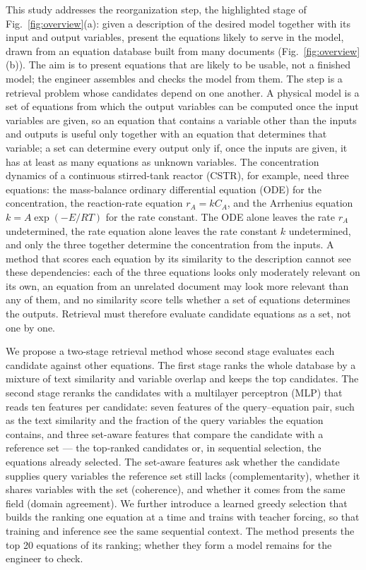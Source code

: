 This study addresses the reorganization step, the highlighted stage of
Fig.~\ref{fig:overview}(a): given a description of the desired model together with its input and
output variables, present the equations likely to serve in the model, drawn from an equation
database built from many documents (Fig.~\ref{fig:overview}(b)). The aim is to present equations
that are likely to be usable, not a finished model; the engineer assembles and checks the model
from them. The step is a retrieval problem whose candidates depend on one another. A physical
model is a set of equations from which the output variables can be computed once the input
variables are given, so an equation that contains a variable other than the inputs and outputs is
useful only together with an equation that determines that variable; a set can determine every
output only if, once the inputs are given, it has at least as many equations as unknown variables.
The concentration dynamics of a continuous stirred-tank reactor (CSTR), for example, need three
equations: the mass-balance ordinary differential equation (ODE) for the concentration, the
reaction-rate equation $r_A = k C_A$, and the Arrhenius equation $k = A\exp(-E/RT)$ for the rate
constant. The ODE alone leaves the rate $r_A$ undetermined, the rate equation alone leaves the rate
constant $k$ undetermined, and only the three together determine the concentration from the
inputs. A method that scores each equation by its similarity to the description cannot see these
dependencies: each of the three equations looks only moderately relevant on its own, an equation
from an unrelated document may look more relevant than any of them, and no similarity score tells
whether a set of equations determines the outputs. Retrieval must therefore evaluate candidate
equations as a set, not one by one.

We propose a two-stage retrieval method whose second stage evaluates each candidate against other
equations. The first stage ranks the whole database by a mixture of text similarity and variable
overlap and keeps the top candidates. The second stage reranks the candidates with a multilayer
perceptron (MLP) that reads ten features per candidate: seven features of the query--equation
pair, such as the text similarity and the fraction of the query variables the equation contains,
and three set-aware features that compare the candidate with a reference set --- the top-ranked
candidates or, in sequential selection, the equations already selected. The set-aware features
ask whether the candidate supplies query variables the reference set still lacks
(complementarity), whether it shares variables with the set (coherence), and whether it comes from
the same field (domain agreement). We further introduce a learned greedy selection that builds the
ranking one equation at a time and trains with teacher forcing, so that training and inference see
the same sequential context. The method presents the top 20 equations of its ranking; whether they
form a model remains for the engineer to check.

